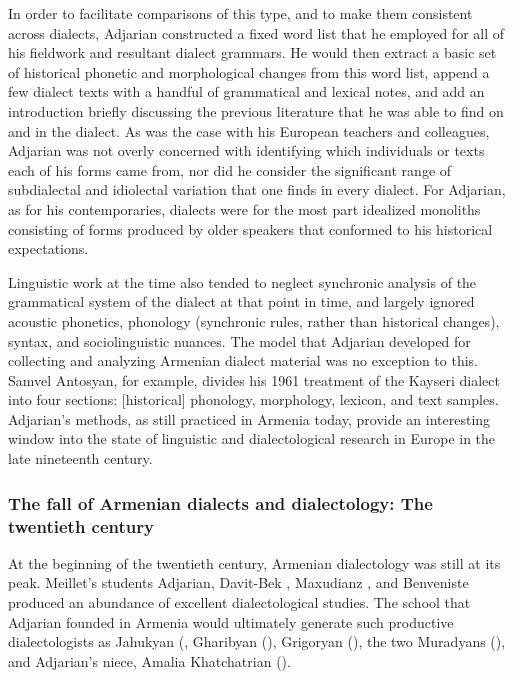 \documentclass[output=paper]{langscibook}
\begin{document}
In order to facilitate comparisons of this type, and to make them consistent across dialects, Adjarian constructed a fixed word list that he employed for all of his fieldwork and resultant dialect grammars. He would then extract a basic set of historical phonetic and morphological changes from this word list, append a few dialect texts with a handful of grammatical and lexical notes, and add an introduction briefly discussing the previous literature that he was able to find on and in the dialect. As was the case with his European teachers and colleagues, Adjarian was not overly concerned with identifying which individuals or texts each of his forms came from, nor did he consider the significant range of subdialectal and idiolectal variation that one finds in every dialect. For Adjarian, as for his contemporaries, dialects were for the most part idealized monoliths consisting of forms produced by older speakers that conformed to his historical expectations.


Linguistic work at the time also tended to neglect synchronic analysis of the grammatical system of the dialect at that point in time, and largely ignored acoustic phonetics, phonology (synchronic rules, rather than historical changes), syntax, and sociolinguistic nuances. The model that Adjarian developed for collecting and analyzing Armenian dialect material was no exception to this.  Samvel Antosyan, for example, divides his 1961 treatment \citep{Antosyan-1961-KayseriDialect} of the Kayseri dialect into four sections: [historical] phonology, morphology, lexicon, and text samples. Adjarian's methods, as still practiced in Armenia today, provide an interesting window into the state of linguistic and dialectological research in Europe in the late nineteenth century.

\subsubsection{The fall of Armenian dialects and dialectology: The twentieth century}\label{sec:vaux:dialectology:past:20}
 At the beginning of the twentieth century, Armenian dialectology was still at its peak. Meillet's students Adjarian, Davit-Bek \citep{DavitBek-1896-PhoneticMarash}, Maxudianz \citep{Maxudianz-1911-ParlerArmenienAkn}, and Benveniste  produced an abundance of excellent dialectological studies. The school that Adjarian founded in Armenia would ultimately generate such productive dialectologists as  Jahukyan (, Gharibyan (), Grigoryan (), the two Muradyans (), and Adjarian's niece, Amalia Khatchatrian (). 
\end{document}
